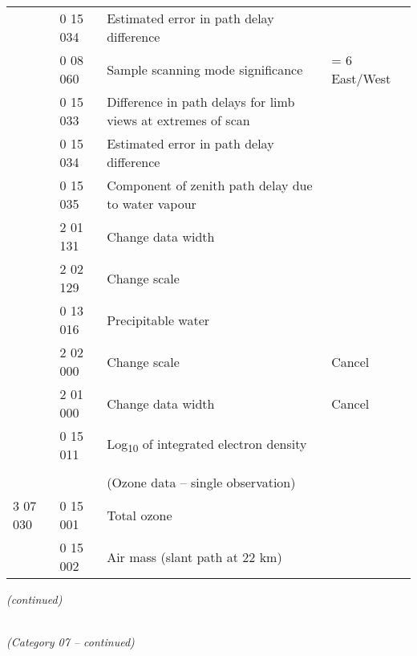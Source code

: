 \begin{longtable}[]{@{}llll@{}}
& 0 15 034 & Estimated error in path delay difference &\tabularnewline
& 0 08 060 & Sample scanning mode significance & = 6 East/West\tabularnewline
& 0 15 033 & Difference in path delays for limb views at extremes of scan &\tabularnewline
& 0 15 034 & Estimated error in path delay difference &\tabularnewline
& 0 15 035 & Component of zenith path delay due to water vapour &\tabularnewline
& 2 01 131 & Change data width &\tabularnewline
& 2 02 129 & Change scale &\tabularnewline
& 0 13 016 & Precipitable water &\tabularnewline
& 2 02 000 & Change scale & Cancel\tabularnewline
& 2 01 000 & Change data width & Cancel\tabularnewline
& 0 15 011 & Log\textsubscript{10} of integrated electron density &\tabularnewline
& & &\tabularnewline
& & (Ozone data -- single observation) &\tabularnewline
3 07 030 & 0 15 001 & Total ozone &\tabularnewline
& 0 15 002 & Air mass (slant path at 22 km) &\tabularnewline
\bottomrule
\end{longtable}

\emph{(continued)}

\emph{\\
(Category 07 -- continued)}


